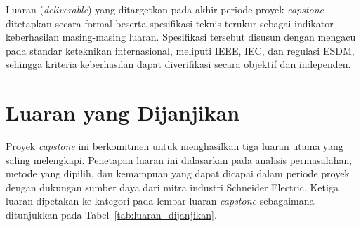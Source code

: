 Luaran (\textit{deliverable}) yang ditargetkan pada akhir periode proyek \textit{capstone} ditetapkan secara formal beserta spesifikasi teknis terukur sebagai indikator keberhasilan masing-masing luaran. Spesifikasi tersebut disusun dengan mengacu pada standar keteknikan internasional, meliputi IEEE, IEC, dan regulasi ESDM, sehingga kriteria keberhasilan dapat diverifikasi secara objektif dan independen.

\section{Luaran yang Dijanjikan}
\label{sec:Luaran_yang_Dijanjikan}

Proyek \textit{capstone} ini berkomitmen untuk menghasilkan tiga luaran utama yang saling melengkapi. Penetapan luaran ini didasarkan pada analisis permasalahan, metode yang dipilih, dan kemampuan yang dapat dicapai dalam periode proyek dengan dukungan sumber daya dari mitra industri Schneider Electric. Ketiga luaran dipetakan ke kategori pada lembar luaran \textit{capstone} sebagaimana ditunjukkan pada Tabel~\ref{tab:luaran_dijanjikan}.

